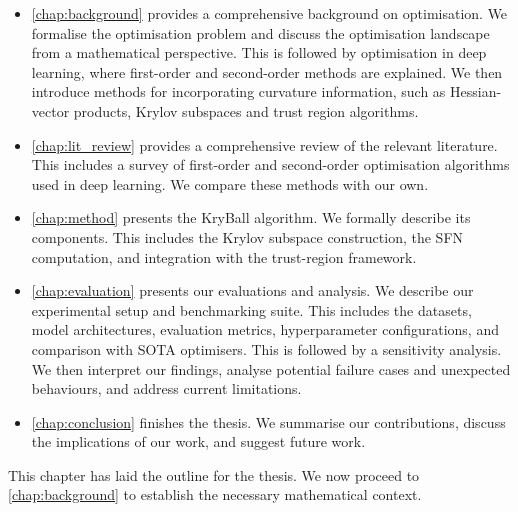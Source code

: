 \begin{itemize}
    \item \cref{chap:background} provides a comprehensive background on optimisation. We formalise the optimisation problem and discuss the optimisation landscape from a mathematical perspective. This is followed by optimisation in deep learning, where first-order and second-order methods are explained. We then introduce methods for incorporating curvature information, such as Hessian-vector products, Krylov subspaces and trust region algorithms.
    \item \cref{chap:lit_review} provides a comprehensive review of the relevant literature. This includes a survey of first-order and second-order optimisation algorithms used in deep learning. We compare these methods with our own.
    \item \cref{chap:method} presents the KryBall algorithm. We formally describe its components. This includes the Krylov subspace construction, the SFN computation, and integration with the trust-region framework.
    \item \cref{chap:evaluation} presents our evaluations and analysis. We describe our experimental setup and benchmarking suite. This includes the datasets, model architectures, evaluation metrics, hyperparameter configurations, and comparison with SOTA optimisers. This is followed by a sensitivity analysis. We then interpret our findings, analyse potential failure cases and unexpected behaviours, and address current limitations. 
    \item \cref{chap:conclusion} finishes the thesis. We summarise our contributions, discuss the implications of our work, and suggest future work.
\end{itemize}

This chapter has laid the outline for the thesis. We now proceed to \cref{chap:background} to establish the necessary mathematical context.